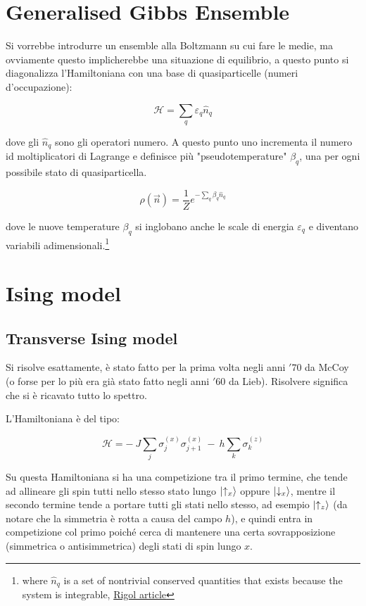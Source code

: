 \documentclass[a4paper,10pt]{article}
\begin{document}
\section{Generalised Gibbs Ensemble}
Si vorrebbe introdurre un ensemble alla Boltzmann su cui fare le medie, ma ovviamente questo implicherebbe una situazione di equilibrio, a questo punto si diagonalizza l'Hamiltoniana con una base di quasiparticelle (numeri d'occupazione):

\begin{equation}
\mathcal{H} = \sum_q \varepsilon_q \hat{n}_q
\end{equation}

\noindent dove gli $\hat{n}_q$ sono gli operatori numero.
A questo punto uno incrementa il numero id moltiplicatori di Lagrange e definisce più "pseudotemperature" $\beta_q$, una per ogni possibile stato di quasiparticella.

\begin{equation}
\rho(\vec{n}) = \frac{1}{Z} e^{- \sum_q \beta_q \hat{n}_q}
\end{equation}

\noindent dove le nuove temperature $\beta_q$ si inglobano anche le scale di energia $\varepsilon_q$ e diventano variabili adimensionali.\footnote{where $\hat{n}_q$	is  a  set  of  nontrivial  conserved  quantities  that  exists because  the  system  is integrable, \href{https://arxiv.org/pdf/1604.03990.pdf}{Rigol article}}

\section{Ising model}

\subsection{Transverse Ising model} Si risolve esattamente, è stato fatto per la prima volta negli anni $'70$ da McCoy (o forse per lo più era già stato fatto negli anni $'60$ da Lieb). Risolvere significa che si è ricavato tutto lo spettro.

L'Hamiltoniana è del tipo:

\begin{equation}
\mathcal{H} = -~ J \sum_j \sigma_j^{(x)} \sigma_{j+1}^{(x)} ~-~ h \sum_k \sigma_k^{(z)}
\end{equation}

Su questa Hamiltoniana si ha una competizione tra il primo termine, che tende ad allineare gli spin tutti nello stesso stato lungo $\ket{\uparrow_x}$ oppure $\ket{\downarrow_x}$, mentre il secondo termine tende a portare tutti gli stati nello stesso, ad esempio $\ket{\uparrow_z}$ (da notare che la simmetria è rotta a causa del campo $h$), e quindi entra in competizione col primo poiché cerca di mantenere una certa sovrapposizione (simmetrica o antisimmetrica) degli stati di spin lungo $x$.
\end{document}
